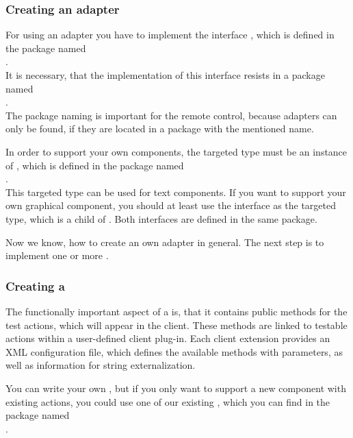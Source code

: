 \subsubsection{Creating an adapter}

For using an adapter you have to implement the interface
, which is defined in the package named\\
.\\
It is necessary, that the implementation of this interface resists in a package
named\\
.\\
The package naming is important for the \app{} remote control, because adapters
can only be found, if they are located in a package with the mentioned name.

In order to support your own components, the targeted type must be an instance
of , which is defined in the package named\\
.\\
This targeted type can be used for text components. If you want to support your
own graphical component, you should at least use the interface
 as the targeted type, which is a child of
. Both interfaces are defined in the same package.

Now we know, how to create an own adapter in general. The next step is to
implement one or more \gdtesterclass.

\subsubsection{Creating a \gdtesterclass}

The functionally important aspect of a \gdtesterclass is, that it
contains public methods for the \app{} test actions, which will appear in
the client. These methods are linked to testable actions within a user-defined
\app{} client plug-in. Each \app{} client extension provides an XML
configuration file, which defines the available methods with parameters, as
well as information for string externalization.

You can write your own \gdtesterclasses, but if you only want to support a new
component with existing actions, you could use one of our existing
\gdtesterclasses, which you can find in the package named\\
.

